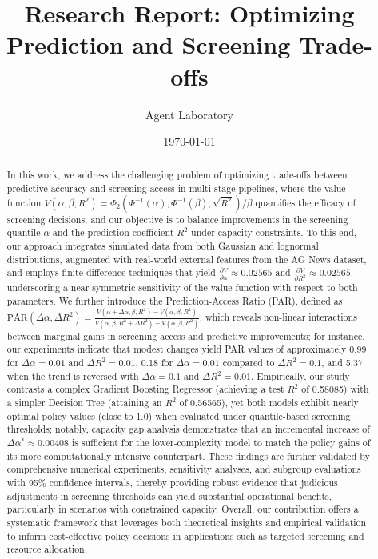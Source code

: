 \documentclass[11pt]{article}
\title{Research Report: Optimizing Prediction and Screening Trade-offs}
\author{Agent Laboratory}
\date{\today}
\begin{document}
\maketitle

\begin{abstract}
In this work, we address the challenging problem of optimizing trade-offs between predictive accuracy and screening access in multi-stage pipelines, where the value function \(V(\alpha, \beta; R^2)=\Phi_2(\Phi^{-1}(\alpha),\Phi^{-1}(\beta);\sqrt{R^2})/\beta\) quantifies the efficacy of screening decisions, and our objective is to balance improvements in the screening quantile \(\alpha\) and the prediction coefficient \(R^2\) under capacity constraints. To this end, our approach integrates simulated data from both Gaussian and lognormal distributions, augmented with real-world external features from the AG News dataset, and employs finite-difference techniques that yield \(\frac{\partial V}{\partial \alpha}\approx 0.02565\) and \(\frac{\partial V}{\partial R^2}\approx 0.02565\), underscoring a near-symmetric sensitivity of the value function with respect to both parameters. We further introduce the Prediction-Access Ratio (PAR), defined as \(\text{PAR}(\Delta \alpha, \Delta R^2)=\frac{V(\alpha+\Delta \alpha,\beta,R^2)-V(\alpha,\beta,R^2)}{V(\alpha,\beta,R^2+\Delta R^2)-V(\alpha,\beta,R^2)}\), which reveals non-linear interactions between marginal gains in screening access and predictive improvements; for instance, our experiments indicate that modest changes yield PAR values of approximately 0.99 for \(\Delta \alpha=0.01\) and \(\Delta R^2=0.01\), 0.18 for \(\Delta \alpha=0.01\) compared to \(\Delta R^2=0.1\), and 5.37 when the trend is reversed with \(\Delta \alpha=0.1\) and \(\Delta R^2=0.01\). Empirically, our study contrasts a complex Gradient Boosting Regressor (achieving a test \(R^2\) of 0.58085) with a simpler Decision Tree (attaining an \(R^2\) of 0.56565), yet both models exhibit nearly optimal policy values (close to 1.0) when evaluated under quantile-based screening thresholds; notably, capacity gap analysis demonstrates that an incremental increase of \(\Delta \alpha^*\approx 0.00408\) is sufficient for the lower-complexity model to match the policy gains of its more computationally intensive counterpart. These findings are further validated by comprehensive numerical experiments, sensitivity analyses, and subgroup evaluations with 95\% confidence intervals, thereby providing robust evidence that judicious adjustments in screening thresholds can yield substantial operational benefits, particularly in scenarios with constrained capacity. Overall, our contribution offers a systematic framework that leverages both theoretical insights and empirical validation to inform cost-effective policy decisions in applications such as targeted screening and resource allocation.
\end{abstract}
\end{document}
